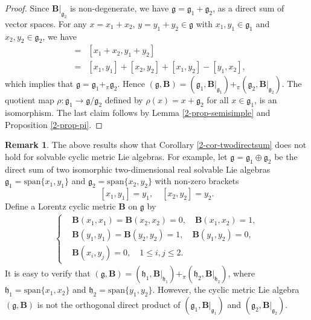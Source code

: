 \documentclass[reqno]{amsart}
\theoremstyle{definition}
\newtheorem{rem}[thm]{Remark}
\begin{document}
\begin{proof}
Since $\mathbf{B}|_{\mathfrak{g}_{2}}$ is non-degenerate, we have  $\mathfrak{g}=\mathfrak{g}_{1}+\mathfrak{g}_{2}$, as a direct sum of vector spaces. For any $x=x_{1}+x_{2}$, $y=y_{1}+y_{2}\in\mathfrak{g}$ with $x_{1},y_{1}\in\mathfrak{g}_{1}$ and  $x_{2},y_{2}\in\mathfrak{g}_{2}$,
 we have
\begin{eqnarray*}
[x,y]&=&[x_{1}+x_{2},y_{1}+y_{2}]\\
     &=&[x_{1},y_{1}]+[x_{2},y_{2}]+[x_{1},y_{2}]-[y_{1},x_{2}],
\end{eqnarray*}
which implies that $\mathfrak{g}=\mathfrak{g}_{1}+_{\pi}\mathfrak{g}_{2}$.
Hence   $(\mathfrak{g},\mathbf{B})
=(\mathfrak{g}_{1},\mathbf{B}|_{\mathfrak{g}_{1}})
+_{\pi}(\mathfrak{g}_{2},\mathbf{B}|_{\mathfrak{g}_{2}})$.
The quotient map $\rho: \mathfrak{g}_{1}\rightarrow \mathfrak{g}/\mathfrak{g}_{2}$ defined by $\rho(x)=x+\mathfrak{g}_{2}$ for all $x\in \mathfrak{g}_{1}$, is an isomorphism.
The last claim follows by Lemma \ref{2-prop-semisimple} and Proposition \ref{2-prop-pi}.
\end{proof}


\begin{rem}
The above results show that Corollary \ref{2-cor-twodirectsum} does not hold for solvable cyclic metric Lie algebras.
For example, let $\mathfrak{g}=\mathfrak{g}_{1}\oplus\mathfrak{g}_{2}$ be the direct sum of two isomorphic two-dimensional real solvable Lie algebras   $\mathfrak{g}_{1}=\mathrm{span}\{x_{1},y_{1}\}$ and $\mathfrak{g}_{2}=\mathrm{span}\{x_{2},y_{2}\}$ with non-zero brackets
$$[x_{1},y_{1}]=y_{1},\quad [x_{2},y_{2}]=y_{2}.$$
Define a Lorentz cyclic metric $\mathbf{B}$  on $\mathfrak{g}$  by
\begin{eqnarray*}
\left\{
\begin{aligned}
  &\mathbf{B}(x_{1},x_{1})=\mathbf{B}(x_{2},x_{2})=0,\quad \mathbf{B}(x_{1},x_{2})=1, \\
  &\mathbf{B}(y_{1},y_{1})=\mathbf{B}(y_{2},y_{2})=1,\quad \mathbf{B}(y_{1},y_{2})=0,\\
  &\mathbf{B}(x_{i},y_{j})=0,\quad 1\leq i,j\leq 2.
\end{aligned}
\right.
\end{eqnarray*}
It is easy to  verify  that
$(\mathfrak{g},\mathbf{B})=(\mathfrak{h}_{1},\mathbf{B}|_{\mathfrak{h}_{1}})
+_{\pi}(\mathfrak{h}_{2},\mathbf{B}|_{\mathfrak{h}_{2}})$,
where  $\mathfrak{h}_{1}=\mathrm{span}\{x_{1},x_{2}\}$ and $\mathfrak{h}_{2}=\mathrm{span}\{y_{1},y_{2}\}$.
 However,  the cyclic metric Lie algebra $(\mathfrak{g},\mathbf{B})$ is not the orthogonal direct product of $(\mathfrak{g}_{1},\mathbf{B}|_{\mathfrak{g}_{1}})$ and
$(\mathfrak{g}_{2},\mathbf{B}|_{\mathfrak{g}_{2}})$.
\end{rem}
\end{document}
